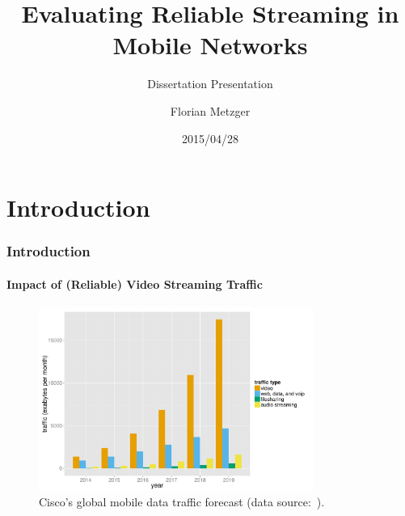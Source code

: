 \documentclass{beamer}
\title[]{Evaluating Reliable Streaming in Mobile Networks}
\subtitle{Dissertation Presentation}
\author{Florian Metzger}
\institute[]
{
	University of Vienna // University of Duisburg-Essen

}
\date[]{2015/04/28}
\begin{document}
\frame{\titlepage}


\section{Introduction}



\begin{frame}
	\frametitle{Introduction}
	\framesubtitle{Impact of (Reliable) Video Streaming Traffic}

	\begin{figure}
		\centering
		\includegraphics[height=6cm]{extras/r-cisco-vni-2014.pdf}
		\caption{Cisco's global mobile data traffic forecast (data source:~\cite{cisco2014VNI}).}
	\end{figure}
\end{frame}
\end{document}
